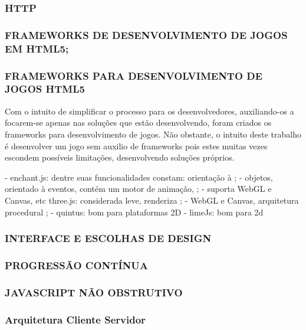 \documentclass[11pt,a4paper]{article}
\begin{document}
\subsubsection{ HTTP}

\subsubsection{FRAMEWORKS DE DESENVOLVIMENTO DE JOGOS EM HTML5;}


\subsubsection{ FRAMEWORKS PARA DESENVOLVIMENTO DE JOGOS HTML5}
Com o intuito de simplificar o processo para os desenvolvedores,
auxiliando-os a focarem-se apenas nas soluções que estão
desenvolvendo, foram criados os frameworks para desenvolvimento de
jogos. Não obstante, o intuito deste trabalho é desenvolver um jogo
sem auxilio de frameworks pois estes muitas vezes escondem possíveis
limitações, desenvolvendo soluções próprios.

- enchant.js: dentre suas funcionalidades constam: orientação à     ;
- objetos, orientado à eventos, contém um motor de animação,       ;
- suporta WebGL e Canvas, etc three.js: considerada leve, renderiza    ;
- WebGL e Canvas, arquitetura procedural                               ;
- quintus: bom para plataformas 2D
- limeJs: bom para 2d

\subsubsection{ INTERFACE E ESCOLHAS DE DESIGN}

\subsubsection{PROGRESSÃO CONTÍNUA}

\subsubsection{JAVASCRIPT NÃO OBSTRUTIVO}

\subsubsection{Arquitetura Cliente Servidor}

 

%
\end{document}
